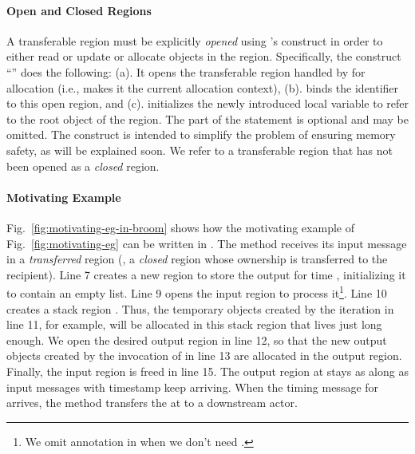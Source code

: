 \paragraph{Open and Closed Regions} A transferable region must be
explicitly \emph{opened} using \name's  construct in order to
either read or update or allocate objects in the region.
Specifically, the construct ``'' does the
following: (a). It opens the transferable region handled by 
for allocation (i.e., makes it the current allocation context), (b).
binds the identifier  to this open region, and (c). initializes
the newly introduced local variable  to refer to the root object
of the region.  The  part of the statement is optional and may
be omitted.  The  construct is intended to simplify the
problem of ensuring memory safety, as will be explained soon.  We
refer to a transferable region that has not been opened as a
\emph{closed} region.

\paragraph{Motivating Example}
Fig.~\ref{fig:motivating-eg-in-broom} shows how the motivating example
of Fig.~\ref{fig:motivating-eg} can be written in \name.  The
 method receives its input message in a
\emph{transferred} region (\ie, a \emph{closed} region whose ownership
is transferred to the recipient).  Line 7 creates a new region to
store the output for time , initializing it to contain an empty
list.  Line 9 opens the input region to process it\footnote{We omit
 annotation in  when we don't need .}.  Line 10
creates a stack region .  Thus, the temporary objects created by
the iteration in line 11, for example, will be allocated in this stack
region that lives just long enough.  We open the desired output region
in line 12, so that the new output objects created by the invocation
of  in line 13 are allocated in the output region.
Finally, the input region is freed in line 15. The output region at
 stays as along as input messages with timestamp  keep
arriving. When the timing message for  arrives, the 
method transfers the  at  to a downstream actor.



